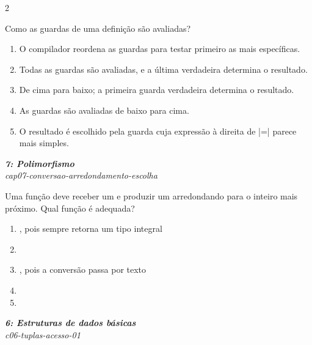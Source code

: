 \documentclass[a4paper,10pt,brazil]{article}
\begin{document}
\begin{multicols}{2}
\begin{flushright}
\end{flushright}
Como as guardas de uma definição são avaliadas?

\begin{enumerate}
  \item O compilador reordena as guardas para testar primeiro as mais específicas.

  \item Todas as guardas são avaliadas, e a última verdadeira determina o resultado.

  \item De cima para baixo; a primeira guarda verdadeira determina o resultado.

  \item As guardas são avaliadas de baixo para cima.

  \item O resultado é escolhido pela guarda cuja expressão à direita de \haskellinline|=| parece mais simples.


\end{enumerate}

\begin{flushright}
  \footnotesize
  \textit{\textbf{7: Polimorfismo}}\\
  \textit{cap07-conversao-arredondamento-escolha}\\

\end{flushright}
Uma função deve receber um  e produzir um  arredondando para o inteiro mais próximo. Qual função é adequada?
\begin{enumerate}
  \item {}, pois sempre retorna um tipo integral
  \item {}
  \item {}, pois a conversão passa por texto
  \item {}
  \item {}

\end{enumerate}

\begin{flushright}
  \footnotesize
  \textit{\textbf{6: Estruturas de dados básicas}}\\
  \textit{c06-tuplas-acesso-01}\\


\end{flushright}
\end{multicols}
\end{document}
